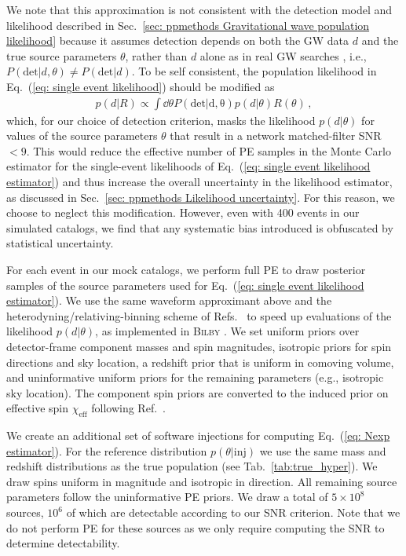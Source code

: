 \begin{refsection}
We note that this approximation is not consistent with the detection model and likelihood described in Sec.~\ref{sec: ppmethods Gravitational wave population likelihood} because it assumes detection depends on both the GW data $d$ and the true source parameters $\theta$, rather than $d$ alone as in real GW searches \cite{Essick:2023upv}, i.e., $P(\mathrm{det}|d,\theta) \neq P(\mathrm{det}|d)$. To be self consistent, the population likelihood in Eq.~(\ref{eq: single event likelihood}) should be modified as
\begin{align}
p(d|R)
\propto
\int \dd{\theta}
P(\mathrm{det|d,\theta}) p(d|\theta) R(\theta)
\, ,
\end{align}
which, for our choice of detection criterion, masks the likelihood $p(d|\theta)$ for values of the source parameters $\theta$ that result in a network matched-filter SNR $<9$. This would reduce the effective number of PE samples in the Monte Carlo estimator for the single-event likelihoods of Eq.~(\ref{eq: single event likelihood estimator}) and thus increase the overall uncertainty in the likelihood estimator, as discussed in Sec.~\ref{sec: ppmethods Likelihood uncertainty}. For this reason, we choose to neglect this modification. However, even with 400 events in our simulated catalogs, we find that any systematic bias introduced is obfuscated by statistical uncertainty.

For each event in our mock catalogs, we perform full PE to draw posterior samples of the source parameters used for Eq.~(\ref{eq: single event likelihood estimator}). We use the same waveform approximant above and the heterodyning/relativing-binning scheme of Refs.~\cite{Cornish:2010kf, Cornish:2021lje, Zackay:2018qdy} to speed up evaluations of the likelihood $p(d|\theta)$, as implemented in \textsc{Bilby} \cite{Ashton:2018jfp, Krishna:2023bug}. We set uniform priors over detector-frame component masses and spin magnitudes, isotropic priors for spin directions and sky location, a redshift prior that is uniform in comoving volume, and uninformative uniform priors for the remaining parameters (e.g., isotropic sky location). The component spin priors are converted to the induced prior on effective spin $\chi_\mathrm{eff}$ following Ref.~\cite{Callister:2021gxf}.

We create an additional set of software injections for computing Eq.~(\ref{eq: Nexp estimator}). For the reference distribution $p(\theta|\mathrm{inj})$ we use the same mass and redshift distributions as the true population (see Tab.~\ref{tab:true_hyper}). We draw spins uniform in magnitude and isotropic in direction. All remaining source parameters follow the uninformative PE priors. We draw a total of $5\times10^8$ sources, $10^6$ of which are detectable according to our SNR criterion. Note that we do not perform PE for these sources as we only require computing the SNR to determine detectability.


\end{refsection}
